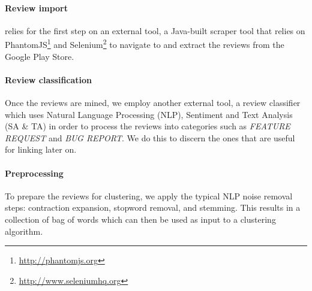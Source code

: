 \paragraph{Review import} 
\tool{} relies for the first step on an external tool, a Java-built scraper tool that relies on PhantomJS\footnote{\url{http://phantomjs.org}} and Selenium\footnote{\url{http://www.seleniumhq.org}} to navigate to and extract the reviews from the Google Play Store.

\paragraph{Review classification}
Once the reviews are mined, we employ another external tool, a review classifier~\cite{panichella2016ardoc} which uses Natural Language Processing (NLP), Sentiment and Text Analysis (SA \& TA) in order to process the reviews into categories such as \textit{FEATURE REQUEST} and \textit{BUG REPORT}. We do this to discern the ones that are useful for linking later on.

\paragraph{Preprocessing}
To prepare the reviews for clustering, we apply the typical NLP noise removal steps: contraction expansion, stopword removal, and stemming. This results in a collection of bag of words which can then be used as input to a clustering algorithm.

